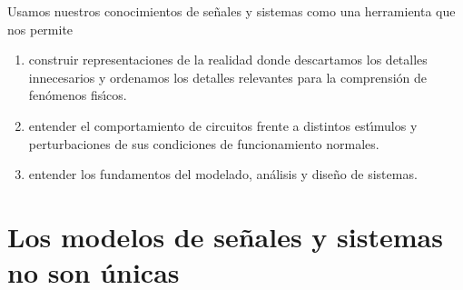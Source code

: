  Usamos nuestros conocimientos de se\~{n}ales y sistemas como una
 herramienta que nos permite
 \begin{enumerate}
 \item construir representaciones de la realidad donde descartamos los
   detalles innecesarios y ordenamos los detalles relevantes para la
   comprensi\'{o}n de fen\'{o}menos fis\'{\i}cos.
        
 \item entender el comportamiento de circuitos frente a distintos
   est\'{\i}mulos y perturbaciones de sus condiciones de funcionamiento
   normales.
 
 \item entender los fundamentos del modelado, an\'{a}lisis y dise\~{n}o de
   sistemas.

 \end{enumerate}

\section{Los modelos de se\~{n}ales y sistemas no son únicas}

